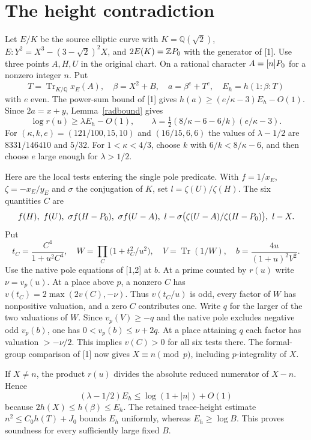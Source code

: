 \documentclass[11pt]{article}
\newcommand{\Q}{\mathbb Q}\newcommand{\Z}{\mathbb Z}
\newcommand{\Tr}{\operatorname{Tr}}\newcommand{\rad}{\operatorname{rad}}
\begin{document}
\section{The height contradiction}
Let $E/K$ be the source elliptic curve with $K=\Q(\sqrt2)$, $E\colon Y^2=X^3-(3-\sqrt2)^2 X$, and $2E(K)=\Z\PPt$ with the generator of [1]. Use three points $A,H,U$ in the original chart. On a rational character $A=[n]P_0$ for a nonzero integer $n$. Put
\[
 T=\Tr_{K/\Q}x_E(A),\quad \beta=X^2+B,\quad a=\beta^e+T^e,\quad E_h=h(1:\beta:T)
\]
with $e$ even. The power-sum bound of [1] gives $h(a)\ge(e/\kappa-3)E_h-O(1)$. Since $2a=x+y$, Lemma~\ref{radbound} gives
\[
 \log r(u)\ge\lambda E_h-O(1),\qquad
 \lambda=\tfrac12(8/\kappa-6-6/k)(e/\kappa-3).
\]
For $(\kappa,k,e)=(121/100,15,10)$ and $(16/15,6,6)$ the values of $\lambda-1/2$ are $8331/146410$ and $5/32$. For $1<\kappa<4/3$, choose $k$ with $6/k<8/\kappa-6$, and then choose $e$ large enough for $\lambda>1/2$.

Here are the local tests entering the single pole predicate. With $f=1/x_E$, $\zeta=-x_E/y_E$ and $\sigma$ the conjugation of $K$, set $l=\zeta(U)/\zeta(H)$. The six quantities $C$ are
\[
 f(H),\ f(U),\ \sigma f(H-\PPt),\ \sigma f(U-A),\ 
 l-\sigma\big(\zeta(U-A)/\zeta(H-\PPt)\big),\ l-X .
\]
Put
\[
 t_C=\frac{C^4}{1+u^2 C^4},\quad W=\prod_C\bigl(1+t_C^2/u^2\bigr),\quad
 V=\Tr(1/W),\quad b=\frac{4u}{(1+u)^2 V^2}.
\]
Use the native pole equations of [1,2] at $b$. At a prime counted by $r(u)$ write $\nu=v_p(u)$. At a place above $p$, a nonzero $C$ has
$v(t_C)=2\max(2v(C),-\nu)$. Thus $v(t_C/u)$ is odd, every factor of $W$ has nonpositive valuation, and a zero $C$ contributes one. Write $q$ for the larger of the two valuations of $W$. Since $v_p(V)\ge-q$ and the native pole excludes negative odd $v_p(b)$, one has $0<v_p(b)\le\nu+2q$. At a place attaining $q$ each factor has valuation $>-\nu/2$. This implies $v(C)>0$ for all six tests there. The formal-group comparison of [1] now gives $X\equiv n\pmod p$, including $p$-integrality of $X$.

If $X\ne n$, the product $r(u)$ divides the absolute reduced numerator of $X-n$. Hence
\[
 (\lambda-1/2) E_h\le \log(1+|n|)+O(1)
\]
because $2h(X)\le h(\beta)\le E_h$. The retained trace-height estimate $n^2\le C_0h(T)+J_0$ bounds $E_h$ uniformly, whereas $E_h\ge\log B$. This proves soundness for every sufficiently large fixed $B$.
\end{document}
